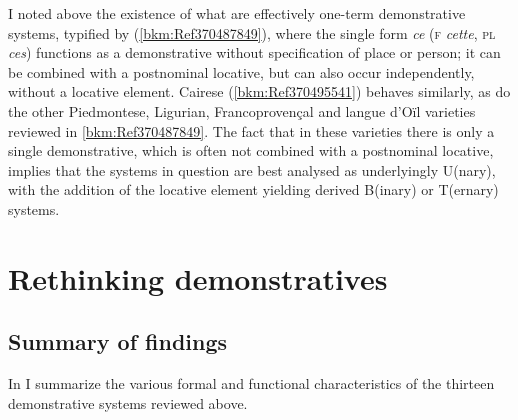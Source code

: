 \documentclass[output=paper]{langsci/langscibook}
\begin{document}
I noted above the existence of what are effectively one-term demonstrative
systems, typified by  (\cref{bkm:Ref370487849}), where the single form
\emph{ce} (\textsc{f} \emph{cette}, \textsc{pl} \emph{ces}) functions as a
demonstrative without specification of place or person; it can be combined with
a postnominal locative, but can also occur independently, without a locative
element. Cairese (\cref{bkm:Ref370495541}) behaves similarly, as do the
other Piedmontese, Ligurian, Francoprovençal and langue d’Oïl varieties
reviewed in \cref{bkm:Ref370487849}. The fact that in these varieties there
is only a single demonstrative, which is often not combined with a postnominal
locative, implies that the systems in question are best analysed as
underlyingly U(nary), with the addition of the locative element yielding
derived B(inary) or T(ernary) systems.

\section{Rethinking demonstratives}

\subsection{Summary of findings}

In  I summarize the various formal and functional
characteristics of the thirteen demonstrative systems reviewed above.
\end{document}
